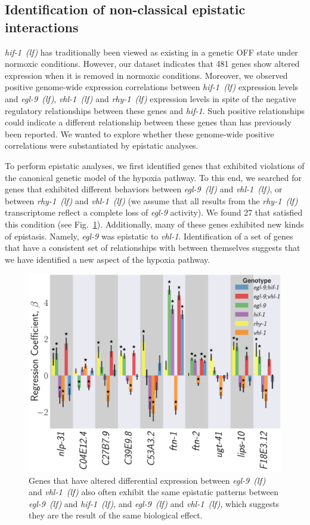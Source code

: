 \documentclass[9pt,twocolumn,twoside]{pnas-new}
\newcommand{\gene}[1]{\emph{#1}}
\newcommand{\egl}{\emph{egl-9~(lf)}}
\newcommand{\rhy}{\emph{rhy-1~(lf)}}
\newcommand{\vhl}{\emph{vhl-1~(lf)}}
\newcommand{\hif}{\emph{hif-1~(lf)}}
\newcommand{\hifn}{481}
\newcommand{\hifohtargets}{27}
\begin{document}
\subsection{Identification of non-classical epistatic interactions}
\label{sub:hifoh}
\hif{} has traditionally been viewed as existing in a genetic OFF state under
normoxic conditions. However, our dataset indicates that \hifn{} genes show
altered expression when it is removed in normoxic conditions. Moreover, we
observed positive genome-wide expression correlations between \hif{} expression
levels and \egl{}, \vhl{} and \rhy{} expression levels in spite of the negative
regulatory relationships between these genes and \gene{hif-1}. Such positive
relationships could indicate a different relationship between these genes
than has previously been reported. We wanted to explore whether these genome-wide
positive correlations were substantiated by epistatic analyses.

To perform epistatic analyses, we first identified genes that exhibited violations
of the canonical genetic model of the hypoxia pathway. To this end, we searched for
genes that exhibited different behaviors between \egl{} and \vhl{}, or
between \rhy{} and \vhl{} (we assume that all results from the
\rhy{} transcriptome reflect a complete loss of \gene{egl-9} activity). We found
\hifohtargets{} that satisfied this condition (see Fig.~\ref{fig:hif1oh}).
Additionally, many of these genes exhibited new kinds of epistasis. Namely,
\gene{egl-9} was epistatic to \gene{vhl-1}. Identification of a set of genes
that have a consistent set of relationships with between themselves suggests that
we have identified a new aspect of the hypoxia pathway.

\begin{figure}[tbhp]
\centering
\includegraphics[width=\linewidth]{figs/hif1oh_epistasis.pdf}
\caption{
Genes that have altered differential expression between \egl{} and \vhl{} also
often exhibit the same epistatic patterns between \egl{} and \hif{}, and \egl{}
and \vhl{}, which suggests they are the result of the same biological effect.
}
\label{fig:hif1oh}
\end{figure}
\end{document}
